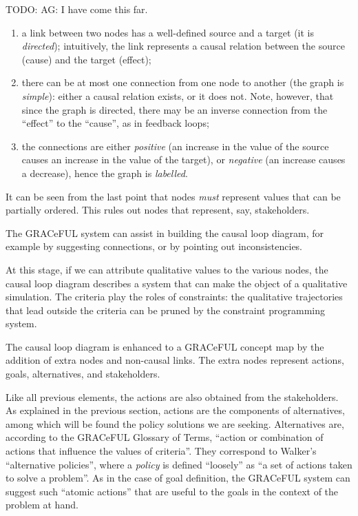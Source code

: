 TODO: AG: I have come this far.

\begin{enumerate}
\def\labelenumi{\alph{enumi}.}
\item
  a link between two nodes has a well-defined source and a target (it is
  \emph{directed}); intuitively, the link represents a causal relation
  between the source (cause) and the target (effect);
\item
  there can be at most one connection from one node to another (the
  graph is \emph{simple}): either a causal relation exists, or it does
  not. Note, however, that since the graph is directed, there may be an
  inverse connection from the ``effect'' to the ``cause'', as in
  feedback loops;
\item
  the connections are either \emph{positive} (an increase in the value
  of the source causes an increase in the value of the target), or
  \emph{negative} (an increase causes a decrease), hence the graph is
  \emph{labelled}.
\end{enumerate}

It can be seen from the last point that nodes \emph{must} represent
values that can be partially ordered. This rules out nodes that
represent, say, stakeholders.

The GRACeFUL system can assist in building the causal loop diagram, for
example by suggesting connections, or by pointing out inconsistencies.

At this stage, if we can attribute qualitative values to the various
nodes, the causal loop diagram describes a system that can make the
object of a qualitative simulation. The criteria play the roles of
constraints: the qualitative trajectories that lead outside the criteria
can be pruned by the constraint programming system.

The causal loop diagram is enhanced to a GRACeFUL concept map by the
addition of extra nodes and non-causal links. The extra nodes represent
actions, goals, alternatives, and stakeholders.

Like all previous elements, the actions are also obtained from the
stakeholders. As explained in the previous section, actions are the
components of alternatives, among which will be found the policy
solutions we are seeking. Alternatives are, according to the GRACeFUL
Glossary of Terms, ``action or combination of actions that influence the
values of criteria''. They correspond to Walker's ``alternative
policies'', where a \emph{policy} is defined ``loosely'' as ``a set of
actions taken to solve a problem''. As in the case of goal definition,
the GRACeFUL system can suggest such ``atomic actions'' that are useful
to the goals in the context of the problem at hand.

